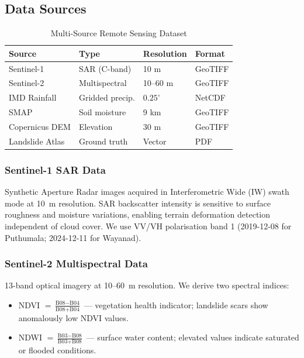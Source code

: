 \documentclass[conference]{IEEEtran}
\begin{document}
\subsection{Data Sources}

\begin{table}[h]
\centering
\caption{Multi-Source Remote Sensing Dataset}
\label{tab:data_sources}
\begin{tabular}{@{}llll@{}}
\toprule
\textbf{Source} & \textbf{Type} & \textbf{Resolution} & \textbf{Format} \\
\midrule
Sentinel-1 & SAR (C-band) & 10 m & GeoTIFF \\
Sentinel-2 & Multispectral & 10--60 m & GeoTIFF \\
IMD Rainfall & Gridded precip. & $0.25^{\circ}$ & NetCDF \\
SMAP & Soil moisture & 9 km & GeoTIFF \\
Copernicus DEM & Elevation & 30 m & GeoTIFF \\
Landslide Atlas & Ground truth & Vector & PDF \\
\bottomrule
\end{tabular}
\end{table}

\subsubsection{Sentinel-1 SAR Data}
Synthetic Aperture Radar images acquired in Interferometric Wide (IW) swath mode at 10~m resolution. SAR backscatter intensity is sensitive to surface roughness and moisture variations, enabling terrain deformation detection independent of cloud cover. We use VV/VH polarisation band 1 (2019-12-08 for Puthumala; 2024-12-11 for Wayanad).

\subsubsection{Sentinel-2 Multispectral Data}
13-band optical imagery at 10--60~m resolution. We derive two spectral indices:
\begin{itemize}
    \item NDVI $= \frac{\text{B08} - \text{B04}}{\text{B08} + \text{B04}}$ — vegetation health indicator; landslide scars show anomalously low NDVI values.
    \item NDWI $= \frac{\text{B03} - \text{B08}}{\text{B03} + \text{B08}}$ — surface water content; elevated values indicate saturated or flooded conditions.
\end{itemize}
\end{document}
